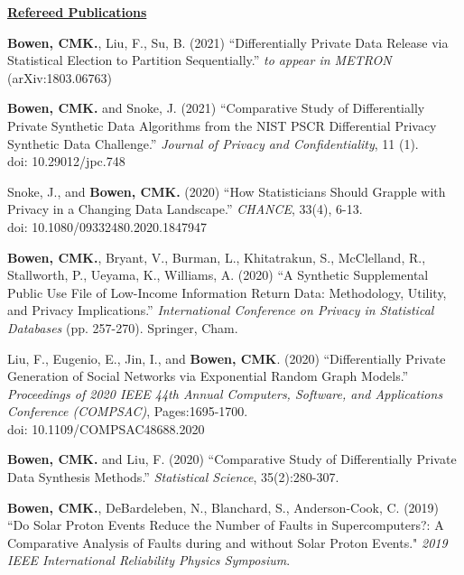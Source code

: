 \documentclass[11.5pt, letterpaper, roman]{moderncv} %
\begin{document}
\noindent\underline{\textbf{Refereed Publications}}
\vspace{4pt}
\begin{etaremune}[topsep=0pt, itemsep=8pt, partopsep=0pt, parsep=0pt]
    \item \textbf{Bowen, CMK.}, Liu, F., Su, B. (2021) ``Differentially Private Data Release via Statistical Election to Partition Sequentially.'' \textit{to appear in METRON}
    (arXiv:1803.06763)
    
    \item \textbf{Bowen, CMK.} and Snoke, J. (2021) ``Comparative Study of Differentially Private Synthetic Data Algorithms from the NIST PSCR Differential Privacy Synthetic Data Challenge.'' \textit{Journal of Privacy and Confidentiality}, 11 (1).\\
    doi: 10.29012/jpc.748
    
    \item Snoke, J., and \textbf{Bowen, CMK.} (2020) ``How Statisticians Should Grapple with Privacy in a Changing Data Landscape.'' \textit{CHANCE}, 33(4), 6-13.\\
    doi: 10.1080/09332480.2020.1847947
    
    \item \textbf{Bowen, CMK.}, Bryant, V., Burman, L., Khitatrakun, S., McClelland, R., Stallworth, P., Ueyama, K., Williams, A. (2020) ``A Synthetic Supplemental Public Use File of Low-Income Information Return Data: Methodology, Utility, and Privacy Implications.'' \textit{International Conference on Privacy in Statistical Databases} (pp. 257-270). Springer, Cham.
    
    \item Liu, F., Eugenio, E., Jin, I., and \textbf{Bowen, CMK}. (2020) ``Differentially Private Generation of Social Networks via Exponential Random Graph Models.'' \textit{Proceedings of 2020 IEEE 44th Annual Computers, Software, and Applications Conference (COMPSAC)}, Pages:1695-1700.\\
    doi: 10.1109/COMPSAC48688.2020

    \item \textbf{Bowen, CMK.} and Liu, F. (2020) ``Comparative Study of Differentially Private Data Synthesis Methods.'' \textit{Statistical Science}, 35(2):280-307.

    \item \textbf{Bowen, CMK.}, DeBardeleben, N., Blanchard, S., Anderson-Cook, C. (2019) ``Do Solar Proton Events Reduce the Number of Faults in Supercomputers?: A Comparative Analysis of Faults during and without Solar Proton Events." \textit{2019 IEEE International Reliability Physics Symposium}.


\end{etaremune}
\end{document}
